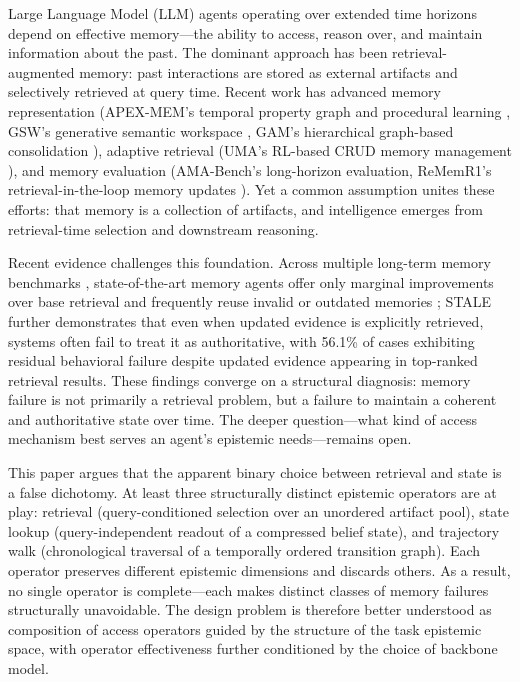 \documentclass[letterpaper,twocolumn,10pt]{article}
\begin{document}
Large Language Model (LLM) agents operating over extended time horizons depend on effective memory---the ability to access, reason over, and maintain information about the past. The dominant approach has been retrieval-augmented memory: past interactions are stored as external artifacts and selectively retrieved at query time. Recent work has advanced memory representation (APEX-MEM's temporal property graph and procedural learning \cite{banerjee2026apexmem}, GSW's generative semantic workspace \cite{rajesh2025gsw}, GAM's hierarchical graph-based consolidation \cite{wu2026gam}), adaptive retrieval (UMA's RL-based CRUD memory management \cite{zhang2026uma}), and memory evaluation (AMA-Bench's long-horizon evaluation, ReMemR1's retrieval-in-the-loop memory updates \cite{shi2025rememr1}). Yet a common assumption unites these efforts: that memory is a collection of artifacts, and intelligence emerges from retrieval-time selection and downstream reasoning.

Recent evidence challenges this foundation. Across multiple long-term memory benchmarks \cite{maharana2024locomo,wu2025longmemeval,xu2025amem}, state-of-the-art memory agents offer only marginal improvements over base retrieval and frequently reuse invalid or outdated memories \cite{uddin2026memora}; STALE \cite{chao2026stale} further demonstrates that even when updated evidence is explicitly retrieved, systems often fail to treat it as authoritative, with 56.1\% of cases exhibiting residual behavioral failure despite updated evidence appearing in top-ranked retrieval results. These findings converge on a structural diagnosis: memory failure is not primarily a retrieval problem, but a failure to maintain a coherent and authoritative state over time. The deeper question---what kind of access mechanism best serves an agent's epistemic needs---remains open.

This paper argues that the apparent binary choice between retrieval and state is a false dichotomy. At least three structurally distinct epistemic operators are at play: retrieval (query-conditioned selection over an unordered artifact pool), state lookup (query-independent readout of a compressed belief state), and trajectory walk (chronological traversal of a temporally ordered transition graph). Each operator preserves different epistemic dimensions and discards others. As a result, no single operator is complete---each makes distinct classes of memory failures structurally unavoidable. The design problem is therefore better understood as composition of access operators guided by the structure of the task epistemic space, with operator effectiveness further conditioned by the choice of backbone model.
\end{document}

